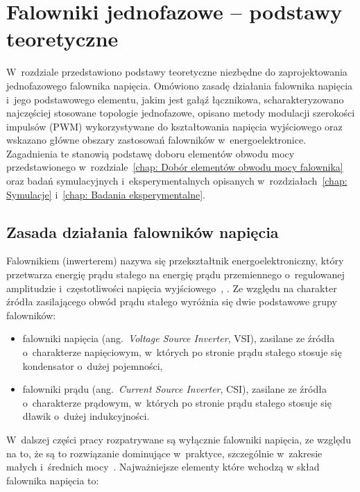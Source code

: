 \chapter{Falowniki jednofazowe -- podstawy teoretyczne}
\label{chap: Falowniki jednofazowe - podstawy teoretyczne}

W~rozdziale przedstawiono podstawy teoretyczne niezbędne do zaprojektowania
jednofazowego falownika napięcia. Omówiono zasadę działania falownika
napięcia i~jego podstawowego elementu, jakim jest gałąź łącznikowa,
scharakteryzowano najczęściej stosowane topologie jednofazowe, opisano
metody modulacji szerokości impulsów (PWM) wykorzystywane do kształtowania
napięcia wyjściowego oraz wskazano główne obszary zastosowań falowników
w~energoelektronice. Zagadnienia te stanowią podstawę doboru elementów
obwodu mocy przedstawionego w~rozdziale~\ref{chap: Dobór elementów obwodu mocy falownika} oraz badań
symulacyjnych i~eksperymentalnych opisanych w~rozdziałach~\ref{chap: Symulacje}
i~\ref{chap: Badania eksperymentalne}.

\section{Zasada działania falowników napięcia}
\label{sec: Zasada działania falowników napięcia}

Falownikiem (inwerterem) nazywa się przekształtnik energoelektroniczny,
który przetwarza energię prądu stałego na energię prądu przemiennego
o~regulowanej amplitudzie i~częstotliwości napięcia
wyjściowego~\cite[s.~200]{mohan2003}, \cite[s.~3]{instrukcja}. Ze względu na charakter źródła 
zasilającego obwód prądu stałego wyróżnia się dwie podstawowe grupy
falowników:
\begin{itemize}
  \item falowniki napięcia (ang.~\textit{Voltage Source Inverter}, VSI),
        zasilane ze źródła o~charakterze napięciowym, w~których po stronie
        prądu stałego stosuje się kondensator o~dużej pojemności,
  \item falowniki prądu (ang.~\textit{Current Source Inverter}, CSI),
        zasilane ze źródła o~charakterze prądowym, w~których po stronie
        prądu stałego stosuje się dławik o~dużej indukcyjności.
\end{itemize}
W~dalszej części pracy rozpatrywane są wyłącznie falowniki napięcia, ze względu na to, że
są to rozwiązanie dominujące w~praktyce, szczególnie w~zakresie małych i~średnich
mocy~\cite[s.~201]{mohan2003}. Najważniejsze elementy które wchodzą w skład falownika napięcia to:

